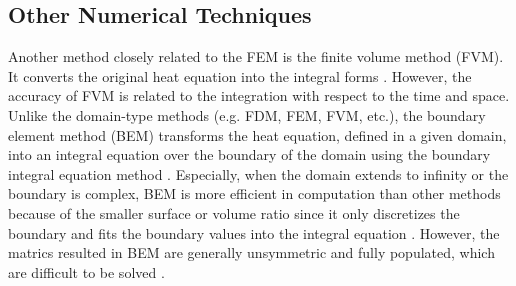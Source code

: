 \subsection{Other Numerical Techniques}


Another method closely related to the FEM is the finite volume method
(FVM). It converts the original heat equation into the integral
forms \cite{eymard2000finite}. However, the accuracy of FVM is related
to the integration with respect to the time and space. Unlike the
domain-type methods (e.g. FDM, FEM, FVM, etc.), the boundary element
method (BEM) transforms the heat equation, defined in a given domain,
into an integral equation over the boundary of the domain using the
boundary integral equation
method \cite{attaway1991boundary}. Especially, when the domain extends
to infinity or the boundary is complex, BEM is more efficient in
computation than other methods because of the smaller surface or
volume ratio \cite{katsikadelis2002boundary} since it only discretizes
the boundary and fits the boundary values into the integral
equation \cite{ang2007beginner}. However, the matrics resulted in BEM
are generally unsymmetric and fully populated, which are difficult to
be solved \cite{mushtaq2010advantages}.


